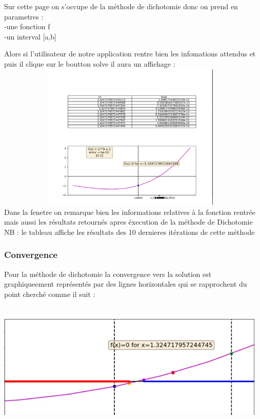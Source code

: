 \documentclass{article}
\begin{document}
Sur cette page on s'occupe de la méthode de dichotomie donc on prend en parametres :\\
-une fonction f\\
-un interval [a,b]

Alors si l'utilisateur de notre application rentre bien les infomations attendus et puis il clique sur le boutton solve il aura un affichage :\\
\includegraphics[width=13cm,height=7cm]{img/dicho_graph.JPG}\\

Dans la fenetre on remarque bien les informations relatives à la fonction rentrée mais aussi les résultats retournés apres éxecution de la méthode de Dichotomie \\
NB : le tableau affiche les résultats des 10 dernieres itérations de cette méthode  
\subsubsection{Convergence}
Pour la méthode de dichotomie la convergence vers la solution est graphiqueement représentés par des lignes horizontales qui se rapprochent du point cherché comme il suit : \\
\includegraphics[width=13cm,height=7cm]{img/dicho_cv.JPG}\\
\end{document}
